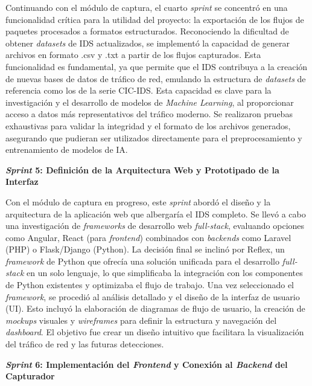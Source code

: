 Continuando con el módulo de captura, el cuarto \textit{sprint} se concentró en una funcionalidad crítica para la utilidad del proyecto: la exportación de los flujos de paquetes procesados a formatos estructurados. Reconociendo la dificultad de obtener \textit{datasets} de IDS actualizados, se implementó la capacidad de generar archivos en formato .csv y .txt a partir de los flujos capturados. Esta funcionalidad es fundamental, ya que permite que el IDS contribuya a la creación de nuevas bases de datos de tráfico de red, emulando la estructura de \textit{datasets} de referencia como los de la serie CIC-IDS. Esta capacidad es clave para la investigación y el desarrollo de modelos de \textit{Machine Learning}, al proporcionar acceso a datos más representativos del tráfico moderno. Se realizaron pruebas exhaustivas para validar la integridad y el formato de los archivos generados, asegurando que pudieran ser utilizados directamente para el preprocesamiento y entrenamiento de modelos de IA.

\textbf{\textit{Sprint} 5: Definición de la Arquitectura Web y Prototipado de la Interfaz}

Con el módulo de captura en progreso, este \textit{sprint} abordó el diseño y la arquitectura de la aplicación web que albergaría el IDS completo. Se llevó a cabo una investigación de \textit{frameworks} de desarrollo web \textit{full-stack}, evaluando opciones como Angular, React (para \textit{frontend}) combinados con \textit{backends} como Laravel (PHP) o Flask/Django (Python). La decisión final se inclinó por Reflex, un \textit{framework} de Python que ofrecía una solución unificada para el desarrollo \textit{full-stack} en un solo lenguaje, lo que simplificaba la integración con los componentes de Python existentes y optimizaba el flujo de trabajo. Una vez seleccionado el \textit{framework}, se procedió al análisis detallado y el diseño de la interfaz de usuario (UI). Esto incluyó la elaboración de diagramas de flujo de usuario, la creación de \textit{mockups} visuales y \textit{wireframes} para definir la estructura y navegación del \textit{dashboard}. El objetivo fue crear un diseño intuitivo que facilitara la visualización del tráfico de red y las futuras detecciones.

\textbf{\textit{Sprint} 6: Implementación del \textit{Frontend} y Conexión al \textit{Backend} del Capturador}

